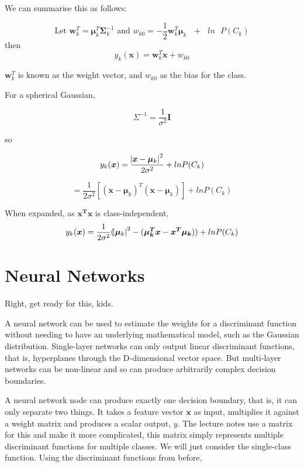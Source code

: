 \documentclass[10pt,a4paper]{article}
\newcommand{\re}[1]{\frac{1}{#1}}
\begin{document}
	We can summarise this as follows:
	
	
	\begin{equation*}
	\text{Let } \bm w_k^T = \bm \mu_k^T\bm \Sigma_k^{-1} \text{  and  } w_{k0} = -\re{2}\bm w_k^T\bm \mu_k \text{  }+\text{  } ln\text{ }P(C_k)
	\end{equation*}
	then 
	\begin{equation*}
	y_k(\bm x) = \bm w_k^T\bm x + w_{k0}
	\end{equation*}
	
	$\bm w_k^T$ is known as the weight vector, and $w_{k0}$ as the bias for the class.
	
	For a spherical Gaussian, 
	
	\begin{equation*}
		\Sigma^{-1} = \re{\sigma^2}\bm I
	\end{equation*}
	
	so 
	
	\begin{equation*}
		y_k(\bm x) = \frac{\abs{\bm x - \bm \mu_k}^2}{2\sigma^2} + ln\text{}P(C_k)
	\end{equation*}
	
	\begin{equation*}
	 = \re{2\sigma^2}[(\bm x - \bm \mu_k)^T(\bm x - \bm \mu_k)] + ln\text{}P(C_k)
	\end{equation*}
	
	When expanded, as $\bm{x^Tx}$ is class-independent,  
	\begin{equation*}
		y_k(\bm x) = \re{2\sigma^2} (\abs{\bm \mu_k}^2 - (\bm{\mu_k^Tx} - \bm{x^T\mu_k})) + ln\text{}P(C_k)
	\end{equation*}
	

	\section{Neural Networks}
	
	Right, get ready for this, kids.
	
	A neural network can be used to estimate the weights for a discriminant function without needing to have an underlying mathematical model, such as the Gaussian distribution. Single-layer networks can only output linear discriminant functions, that is, hyperplanes through the D-dimensional vector space. But multi-layer networks can be non-linear and so can produce arbitrarily complex decision boundaries. 
	
	A neural network node can produce exactly one decision boundary, that is, it can only separate two things. It takes a feature vector $\bm x$ as input, multiplies it against a weight matrix and produces a scalar output, $y$. The lecture notes use a matrix for this and make it more complicated, this matrix simply represents multiple discriminant functions for multiple classes. We will just consider the single-class function.
	Using the discriminant functions from before, 
	
\end{document}
